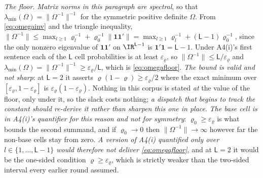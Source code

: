 \emph{The floor.} \emph{Matrix norms in this paragraph are spectral}, so that
$\lambda_{\min}(\Omega)=\|\Omega^{-1}\|^{-1}$ for the symmetric positive definite $\Omega$. From
\eqref{eq:omegainv} and the triangle inequality,
$\|\Omega^{-1}\|\le\max_{l\ge1}\varrho_l^{-1}+\varrho_0^{-1}\|\mathbf1\mathbf1'\|
=\max_{l\ge1}\varrho_l^{-1}+(\mathsf L-1)\varrho_0^{-1}$, since the only nonzero eigenvalue of
$\mathbf1\mathbf1'$ on $\IR^{\mathsf L-1}$ is $\mathbf1'\mathbf1=\mathsf L-1$. Under A4(i)'s first sentence each of the
$\mathsf L$ cell probabilities is at least $\varepsilon_\varrho$, so
$\|\Omega^{-1}\|\le\mathsf L/\varepsilon_\varrho$ and
$\lambda_{\min}(\Omega)=\|\Omega^{-1}\|^{-1}\ge\varepsilon_\varrho/\mathsf L$, which is
\eqref{eq:omegafloor}. \emph{The bound is valid and not sharp}: at $\mathsf L=2$ it asserts
$\varrho(1-\varrho)\ge\varepsilon_\varrho/2$ where the exact minimum over
$[\varepsilon_\varrho,1-\varepsilon_\varrho]$ is $\varepsilon_\varrho(1-\varepsilon_\varrho)$. Nothing in
this corpus is stated \emph{at} the value of the floor, only under it, so the slack costs nothing;
\emph{a dispatch that begins to track the constant should re-derive it rather than sharpen this one in
place}. \emph{The base cell is in A4(i)'s quantifier for this reason and not for symmetry}:
$\varrho_0\ge\varepsilon_\varrho$ is what bounds the second summand, and if $\varrho_0\to0$ then
$\|\Omega^{-1}\|\to\infty$ however far the non-base cells stay from zero. \emph{A version of A4(i)
quantified only over $l\in\{1,\dots,\mathsf L-1\}$ would therefore not deliver
\eqref{eq:omegafloor}}, and at $\mathsf L=2$ it would be the one-sided condition
$\varrho\ge\varepsilon_\varrho$, which is strictly weaker than the two-sided interval every earlier
round assumed.

